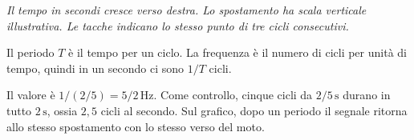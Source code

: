 \documentclass[11pt,a4paper]{article}
\begin{document}
\begin{samepage}
\begin{center}
\par
\small\itshape Il tempo in secondi cresce verso destra. Lo spostamento ha scala verticale illustrativa. Le tacche indicano lo stesso punto di tre cicli consecutivi.
\end{center}
Il periodo \(T\) è il tempo per un ciclo. La frequenza è il numero di cicli per unità di tempo, quindi in un secondo ci sono \(1/T\) cicli.\par

Il valore è \(1/(2/5)=5/2\,\mathrm{Hz}\). Come controllo, cinque cicli da \(2/5\,\mathrm s\) durano in tutto \(2\,\mathrm s\), ossia \(2{,}5\) cicli al secondo. Sul grafico, dopo un periodo il segnale ritorna allo stesso spostamento con lo stesso verso del moto.\par

\end{samepage}
\end{document}
